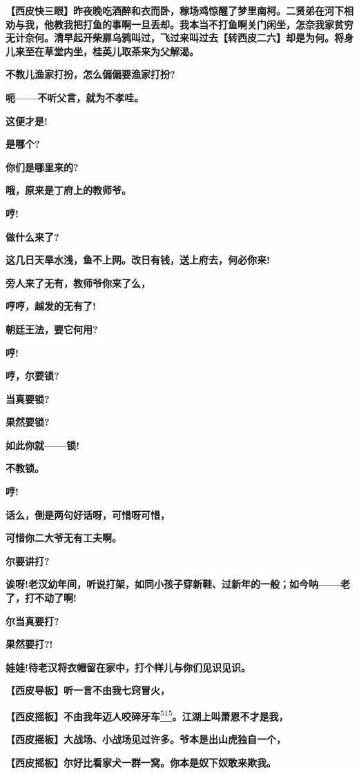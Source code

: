 \textbf{【西皮快三眼】昨夜晚吃酒醉和衣而卧，稼场鸡惊醒了梦里南柯。二贤弟在河下相劝与我，他教我把打鱼的事啊一旦丢却。我本当不打鱼啊关门闲坐，怎奈我家贫穷无计奈何。清早起开柴扉乌鸦叫过，飞过来叫过去【转西皮二六】却是为何。将身儿来至在草堂内坐，桂英儿取茶来为父解渴。}

\textbf{不教儿渔家打扮，怎么偏偏要渔家打扮?}

\textbf{呃------不听父言，就为不孝哇。}

\textbf{这便才是!}

\textbf{是哪个?}

\textbf{你们是哪里来的?}

\textbf{哦，原来是丁府上的教师爷。}

\textbf{哼!}

\textbf{做什么来了?}

\textbf{这几日天旱水浅，鱼不上网。改日有钱，送上府去，何必你来!}

\textbf{旁人来了无有，教师爷你来了么，}

\textbf{哼哼，越发的无有了!}

\textbf{朝廷王法，要它何用?}

\textbf{哼!}

\textbf{哼，尔要锁?}

\textbf{当真要锁?}

\textbf{果然要锁?}

\textbf{如此你就------锁!}

\textbf{不教锁。}

\textbf{哼!}

\textbf{话么，倒是两句好话呀，可惜呀可惜，}

\textbf{可惜你二大爷无有工夫啊。}

\textbf{尔要讲打?}

\textbf{诶呀!老汉幼年间，听说打架，如同小孩子穿新鞋、过新年的一般；如今呐------老了，打不动了啊!}

\textbf{尔当真要打?}

\textbf{果然要打?!}

\textbf{娃娃!待老汉将衣帽留在家中，打个样儿与你们见识见识。}

\textbf{【西皮导板】听一言不由我七窍冒火，}

\textbf{【西皮摇板】不由我年迈人咬碎牙车}\protect\hyperlink{fn515}{\textsuperscript{515}}\textbf{。江湖上叫萧恩不才是我，}

\textbf{【西皮摇板】大战场、小战场见过许多。爷本是出山虎独自一个，}

\textbf{【西皮摇板】尔好比看家犬一群一窝。你本是奴下奴敢来欺我。}

